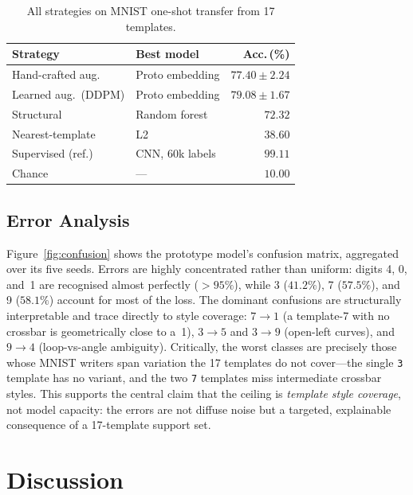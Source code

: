 \documentclass[final,5p,times,twocolumn]{elsarticle}
\begin{document}
\begin{table}[t]
  \caption{All strategies on MNIST one-shot transfer from 17 templates.}
  \label{tab:unified}
  \centering
  \begin{tabular}{@{}llr@{}}
    \toprule
    Strategy & Best model & Acc.\,(\%) \\
    \midrule
    Hand-crafted aug. & Proto embedding        & $77.40 \pm 2.24$ \\
    Learned aug.\ (DDPM) & Proto embedding      & $\mathbf{79.08 \pm 1.67}$ \\
    Structural        & Random forest          & $72.32$ \\
    Nearest-template  & L2                      & $38.60$ \\
    \midrule
    Supervised (ref.) & CNN, 60k labels         & $99.11$ \\
    Chance            & ---                     & $10.00$ \\
    \bottomrule
  \end{tabular}
\end{table}

\subsection{Error Analysis}
\label{sec:errors}

Figure~\ref{fig:confusion} shows the prototype model's confusion matrix, aggregated over
its five seeds. Errors are highly concentrated rather than uniform: digits 4, 0, and~1 are
recognised almost perfectly ($>95\%$), while 3 ($41.2\%$), 7 ($57.5\%$), and 9 ($58.1\%$)
account for most of the loss.
The dominant confusions are structurally interpretable and trace directly to style
coverage: \emph{$7\!\to\!1$} (a template-7 with no crossbar is geometrically close to a~1),
\emph{$3\!\to\!5$} and \emph{$3\!\to\!9$} (open-left curves), and \emph{$9\!\to\!4$}
(loop-vs-angle ambiguity).
Critically, the worst classes are precisely those whose MNIST writers span variation the 17
templates do not cover—the single \texttt{3} template has no variant, and the two \texttt{7}
templates miss intermediate crossbar styles. This supports the central claim that the
ceiling is \emph{template style coverage}, not model capacity: the errors are not diffuse
noise but a targeted, explainable consequence of a 17-template support set.

\section{Discussion}
\end{document}

